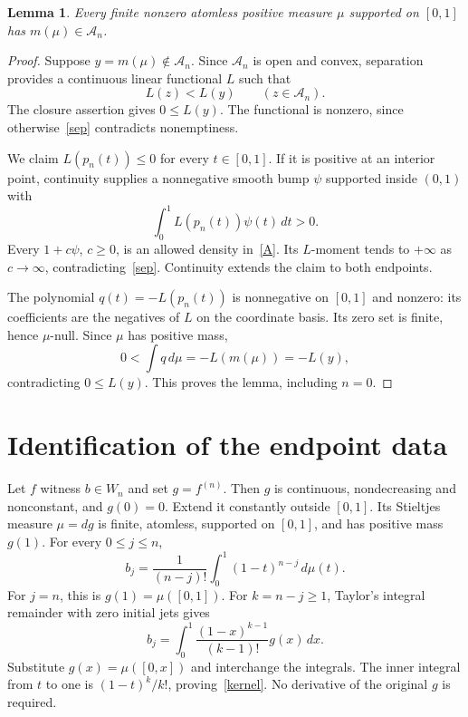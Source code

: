 \documentclass[11pt]{article}
\newtheorem{lemma}[theorem]{Lemma}
\newcommand{\A}{\mathcal A}
\begin{document}
\begin{lemma}\label{representation}
Every finite nonzero atomless positive measure $\mu$ supported on $[0,1]$
has $m(\mu)\in\A_n$.
\end{lemma}
\begin{proof}
Suppose $y=m(\mu)\notin\A_n$. Since $\A_n$ is open and convex,
separation provides a continuous linear functional $L$ such that
\begin{equation}\label{sep}
 L(z)<L(y)\qquad(z\in\A_n).
\end{equation}
The closure assertion gives $0\le L(y)$. The functional is nonzero, since
otherwise~\eqref{sep} contradicts nonemptiness.

We claim $L(p_n(t))\le0$ for every $t\in[0,1]$. If it is positive at
an interior point, continuity supplies a nonnegative smooth bump $\psi$
supported inside $(0,1)$ with
\[
 \int_0^1L(p_n(t))\psi(t)\,dt>0.
\]
Every $1+c\psi$, $c\ge0$, is an allowed density in~\eqref{A}. Its
$L$-moment tends to $+\infty$ as $c\to\infty$, contradicting~\eqref{sep}.
Continuity extends the claim to both endpoints.

The polynomial $q(t)=-L(p_n(t))$ is nonnegative on $[0,1]$ and nonzero:
its coefficients are the negatives of $L$ on the coordinate basis. Its
zero set is finite, hence $\mu$-null. Since $\mu$ has positive mass,
\[
 0<\int q\,d\mu=-L(m(\mu))=-L(y),
\]
contradicting $0\le L(y)$. This proves the lemma, including $n=0$.
\end{proof}

\section{Identification of the endpoint data}
Let $f$ witness $b\in W_n$ and set $g=f^{(n)}$. Then $g$ is continuous,
nondecreasing and nonconstant, and $g(0)=0$. Extend it constantly outside
$[0,1]$. Its Stieltjes measure $\mu=dg$ is finite, atomless, supported
on $[0,1]$, and has positive mass $g(1)$. For every $0\le j\le n$,
\begin{equation}\label{kernel}
 b_j=\frac1{(n-j)!}\int_0^1(1-t)^{n-j}\,d\mu(t).
\end{equation}
For $j=n$, this is $g(1)=\mu([0,1])$. For $k=n-j\ge1$, Taylor's integral
remainder with zero initial jets gives
\[
 b_j=\int_0^1\frac{(1-x)^{k-1}}{(k-1)!}g(x)\,dx.
\]
Substitute $g(x)=\mu([0,x])$ and interchange the integrals. The inner
integral from $t$ to one is $(1-t)^k/k!$, proving~\eqref{kernel}. No
derivative of the original $g$ is required.
\end{document}
